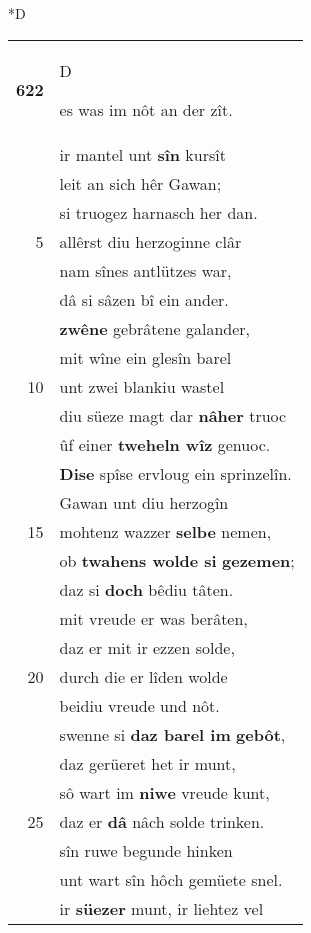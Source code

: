 \documentclass[8pt,a4paper,notitlepage]{article}
\begin{document}
\begin{table}[ht]
\begin{minipage}[t]{0.5\linewidth}
\small
\begin{center}*D
\end{center}
\begin{tabular}{rl}
\textbf{622} & \begin{large}D\end{large}es was im nôt an der zît.\\ 
 & ir mantel unt \textbf{sîn} kursît\\ 
 & leit an sich hêr Gawan;\\ 
 & si truogez harnasch her dan.\\ 
5 & allêrst diu herzoginne clâr\\ 
 & nam sînes antlützes war,\\ 
 & dâ si sâzen bî ein ander.\\ 
 & \textbf{zwêne} gebrâtene galander,\\ 
 & mit wîne ein glesîn barel\\ 
10 & unt zwei blankiu wastel\\ 
 & diu süeze magt dar \textbf{nâher} truoc\\ 
 & ûf einer \textbf{tweheln wîz} genuoc.\\ 
 & \textbf{Dise} spîse ervloug ein sprinzelîn.\\ 
 & Gawan unt diu herzogîn\\ 
15 & mohtenz wazzer \textbf{selbe} nemen,\\ 
 & ob \textbf{twahens wolde si} \textbf{gezemen};\\ 
 & daz si \textbf{doch} bêdiu tâten.\\ 
 & mit vreude er was berâten,\\ 
 & daz er mit ir ezzen solde,\\ 
20 & durch die er lîden wolde\\ 
 & beidiu vreude und nôt.\\ 
 & swenne si \textbf{daz barel im} \textbf{gebôt},\\ 
 & daz gerüeret het ir munt,\\ 
 & sô wart im \textbf{niwe} vreude kunt,\\ 
25 & daz er \textbf{dâ} nâch solde trinken.\\ 
 & sîn ruwe begunde hinken\\ 
 & unt wart sîn hôch gemüete snel.\\ 
 & ir \textbf{süezer} munt, ir liehtez vel\\ 

\end{tabular}
\end{minipage}
\end{table}
\end{document}
